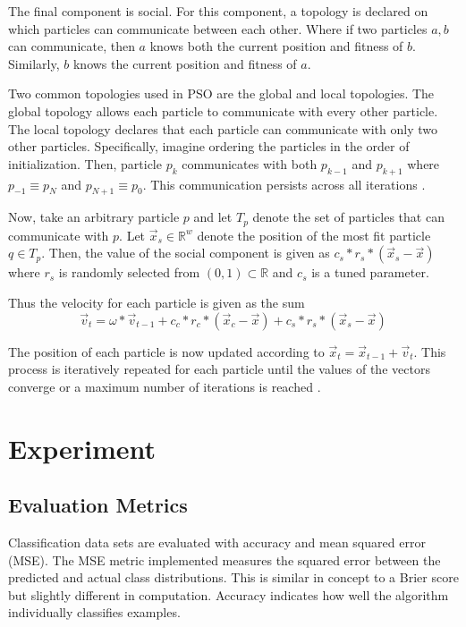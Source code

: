 \documentclass[twoside,11pt]{article}
\newcommand{\Rw}{\mathbb{R}^w }
\begin{document}
	The final component is social. 
	For this component, a topology is declared on which particles can communicate between each other.
	Where if two particles $a,b$ can communicate, then $a$ knows both the current position and fitness of $b$.
	Similarly, $b$ knows the current position and fitness of $a$.
	
	Two common topologies used in PSO are the global and local topologies. 
	The global topology allows each particle to communicate with every other particle. 
	The local topology declares that each particle can communicate with only two other particles.
	Specifically, imagine ordering the particles in the order of initialization.
	Then, particle $p_k$ communicates with both $p_{k-1}$ and $p_{k+1}$ where $p_{-1} \equiv p_N$ and $p_{N+1} \equiv p_{0}$.
	This communication persists across all iterations \citep{og-pso}.
	
	Now, take an arbitrary particle $p$ and let $T_p$ denote the set of particles that can communicate with $p$.
	Let $\vec{x}_s \in \Rw$ denote the position of the most fit particle $q \in T_p$. Then, the value of the social component is given as $c_s * r_s * (\vec{x}_s - \vec{x})$ where $r_s$ is randomly selected from $(0,1) \subset \mathbb{R}$ and $c_s$ is a tuned parameter.
	
	Thus the velocity for each particle is given as the sum
	$$\vec{v}_t = \omega * \vec{v}_{t-1} + c_c*r_c*(\vec{x}_c - \vec{x}) + c_s*r_s*(\vec{x}_s - \vec{x})$$
	
	The position of each particle is now updated according to $\vec{x}_t = \vec{x}_{t-1} + \vec{v}_t$. This process is iteratively repeated for each particle until the values of the vectors converge or a maximum number of iterations is reached \citep{og-pso}.
		
\section{Experiment}

\subsection{Evaluation Metrics}

	Classification data sets are evaluated with accuracy and mean squared error (MSE). 
	The MSE metric implemented measures the squared error between the predicted and actual class distributions. 
	This is similar in concept to a Brier score but slightly different in computation. Accuracy indicates how well the algorithm individually classifies examples.
	
\end{document}
